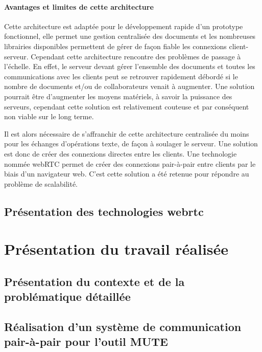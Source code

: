 \documentclass{tnreport}
\begin{document}
\subsubsection{Avantages et limites de cette architecture}

Cette architecture est adaptée pour le développement rapide d'un prototype fonctionnel, elle permet une gestion centralisée des documents et les nombreuses librairies disponibles permettent de gérer de façon fiable les connexions client-serveur. Cependant cette architecture rencontre des problèmes de passage à l'échelle. En effet, le serveur devant gérer l'ensemble des documents et toutes les communications avec les clients peut se retrouver rapidement débordé si le nombre de documents et/ou de collaborateurs venait à augmenter. Une solution pourrait être d'augmenter les moyens matériels, à savoir la puissance des serveurs, cependant cette solution est relativement couteuse et par conséquent non viable sur le long terme.

Il est alors nécessaire de s'affranchir de cette architecture centralisée du moins pour les échanges d'opérations texte, de façon à soulager le serveur. Une solution est donc de créer des connexions directes entre les clients. Une technologie nommée webRTC permet de créer des connexions pair-à-pair entre clients par le biais d'un navigateur web. C'est cette solution a été retenue pour répondre au problème de scalabilité.




\section{Présentation des technologies webrtc}

\cleardoublepage

\chapter{Présentation du travail réalisée}

\section{Présentation du contexte et de la problématique détaillée}

\section{Réalisation d'un système de communication pair-à-pair pour l'outil MUTE}
\end{document}

